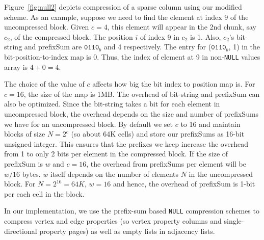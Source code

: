 Figure~\ref{fig:null2} depicts compression of a sparse column using our modified scheme. As an example, suppose we need to find the element at index 9 of the uncompressed block. Given $c=4$, this element will appear in the 2nd chunk, say $c_2$, of the compressed block. The position $i$ of index 9 in $c_2$ is 1. Also, $c_2$'s bit-string and prefixSum are $\texttt{0110}_b$ and 4 respectively. The entry for ($\texttt{0110}_b$, 1) in the bit-position-to-index map is 0. Thus, the index of element at 9 in non-\texttt{NULL} values array is $4+0 = 4$.

The choice of the value of $c$ affects how big the bit index to position map is. For $c = 16$, the size of the map is 1MB. The overhead of bit-string and prefixSum can also be optimized. Since the bit-string takes a bit for each element in uncompressed block, the overhead depends on the size and number of prefixSums we have for an uncompressed block. By default we set $c$ to 16 and maintain blocks of size $N=2^c$ (so about 64K cells) and store our prefixSums as 16-bit unsigned integer. This ensures that the prefixes we keep increase the overhead from 1 to only 2 bits per element in the compressed block. If the size of prefixSum is $w$ and $c=16$, the overhead from prefixSums per element will be $w/16$ bytes. $w$ itself depends on the number of elements $N$ in the uncompressed block. For $N=2^{16}=64K$, $w=16$ and hence, the overhead of prefixSum is 1-bit per each cell in the block.

In our implementation, we use the prefix-sum based \texttt{NULL} compression schemes to compress vertex and edge properties (so vertex property columns and single-directional property pages) as well as empty lists in adjacency lists.  
















